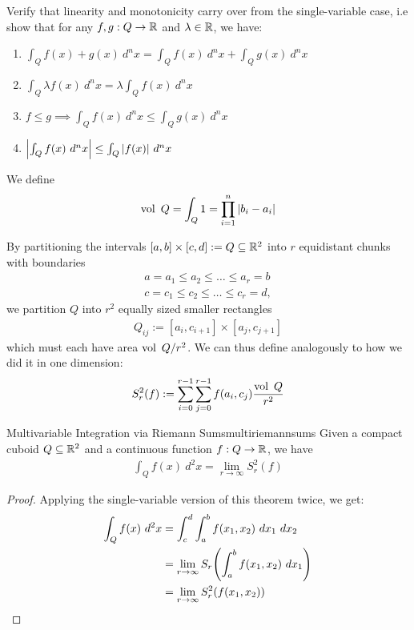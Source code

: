\begin{exercise}
	Verify that linearity and monotonicity carry over from the single-variable case, i.e show that for any $f,g : Q \to \mathbb{R}$ and $\lambda \in \mathbb{R}$, we have:
	\begin{enumerate}
		\item $\int_Q f(x) + g(x) ~d^nx = \int_Q f(x) ~d^nx + \int_Q g(x) ~d^nx$
		\item $\int_Q \lambda f(x) ~d^nx = \lambda \int_Q f(x) ~d^nx$
		\item $f \leq g \implies \int_Q f(x) ~d^nx \leq \int_Q g(x) ~d^nx$
		\item $\abs{\int_Q f(x) ~d^nx} \leq \int_Q \abs{f(x)} ~d^nx$
	\end{enumerate}
\end{exercise}
\begin{definition}
	We define
	\begin{align*}
		\operatorname{vol}~ Q = \int_Q 1 = \prod_{i = 1}^n \abs{b_i - a_i}
	\end{align*}
\end{definition}
\begin{definition}
	By partitioning the intervals $[a, b] \times [c, d] := Q \subseteq \mathbb{R}^2$ into $r$ equidistant chunks with boundaries
	\begin{align*}
		a = a_{1} \leq a_{2} \leq \hdots \leq a_{r} = b\\
		c = c_{1} \leq c_{2} \leq \hdots \leq c_{r} = d,
	\end{align*}
	we partition $Q$ into $r^2$ equally sized smaller rectangles
	\begin{align*}
		Q_{ij} := [a_i, c_{i+1}] \times [a_j, c_{j+1}]
	\end{align*}
	which must each have area $\operatorname{vol}~ Q /r^2$. We can thus define  analogously to how we did it in one dimension:
	\begin{align*}
		S_r^2(f) := \sum_{i = 0}^{r-1} \sum_{j = 0}^{r-1} f(a_i, c_j) \frac{\operatorname{vol}~ Q}{r^2}
	\end{align*}
\end{definition}
\begin{importantlemma}{Multivariable Integration via Riemann Sums}{multiriemannsums}
	Given a compact cuboid $Q \subseteq \mathbb{R}^2$ and a continuous function $f : Q \to \mathbb{R}$, we have
	\begin{align*}
		\int_Q f(x) ~d^2x = \lim_{r \to \infty} S_r^2(f)
	\end{align*}
\end{importantlemma}
\begin{proof}
	Applying the single-variable version of this theorem twice, we get:
	\begin{align*}
		\int_Q f(x) ~d^2x
		&=
		\int_c^d \int_a^b f(x_1, x_2) ~dx_1 ~dx_2\\
		&=
		\lim_{r \to \infty} S_r\qty(\int_a^b f(x_1, x_2) ~dx_1)\\
		&=
		\lim_{r \to \infty} S_r^2\qty(f(x_1, x_2))
	\end{align*}
\end{proof}